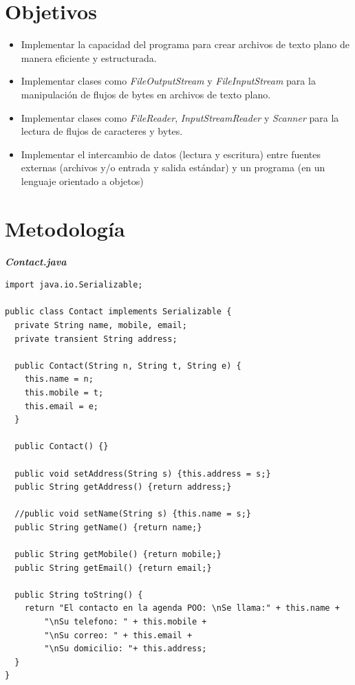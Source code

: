 \documentclass[11pt, twocolumn]{article}
\begin{document}
  \section*{Objetivos}
  \begin{itemize}
    \item Implementar la capacidad del programa para crear archivos de texto plano de manera eficiente y estructurada.
    \item Implementar clases como \textit{FileOutputStream} y \textit{FileInputStream} para la manipulación de flujos de bytes en archivos de texto plano.
    \item Implementar clases como \textit{FileReader}, \textit{InputStreamReader} y \textit{Scanner} para la lectura de flujos de caracteres y bytes.
    \item Implementar el intercambio de datos (lectura y escritura) entre fuentes externas (archivos y/o entrada y salida estándar) y un programa (en un lenguaje orientado a objetos)
  \end{itemize}

  \section*{Metodología}
  \textit{\textbf{Contact.java}}
  \begin{lstlisting}
import java.io.Serializable;

public class Contact implements Serializable {
  private String name, mobile, email;
  private transient String address;
   
  public Contact(String n, String t, String e) {
    this.name = n;
    this.mobile = t;
    this.email = e;
  }

  public Contact() {}

  public void setAddress(String s) {this.address = s;}
  public String getAddress() {return address;}

  //public void setName(String s) {this.name = s;}
  public String getName() {return name;}

  public String getMobile() {return mobile;}
  public String getEmail() {return email;}

  public String toString() {
    return "El contacto en la agenda POO: \nSe llama:" + this.name + 
        "\nSu telefono: " + this.mobile	+ 
        "\nSu correo: " + this.email + 
        "\nSu domicilio: "+ this.address;
  }
}
  \end{lstlisting}
\end{document}
